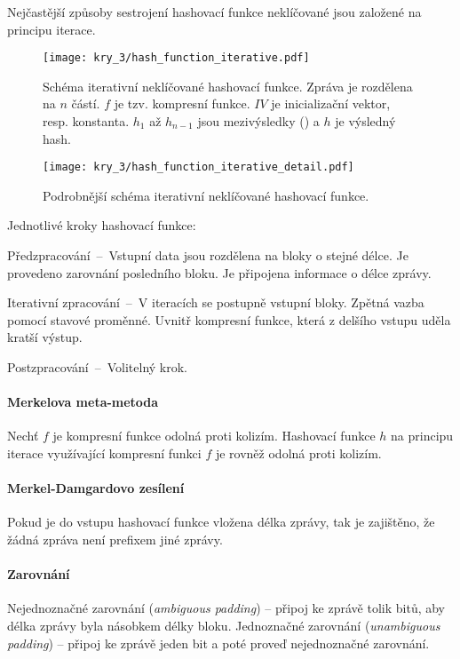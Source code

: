 Nejčastější způsoby sestrojení hashovací funkce neklíčované jsou založené na principu iterace.

\begin{figure}[H]
    \centering
    \texttt{[image: kry\_3/hash\_function\_iterative.pdf]}
    \caption{Schéma iterativní neklíčované hashovací funkce. Zpráva je rozdělena na $n$ částí. $f$ je tzv. kompresní funkce. $IV$ je inicializační vektor, resp. konstanta. $h_1$ až $h_{n-1}$ jsou mezivýsledky () a $h$ je výsledný hash.}
\end{figure}

\begin{figure}[H]
    \centering
    \texttt{[image: kry\_3/hash\_function\_iterative\_detail.pdf]}
    \caption{Podrobnější schéma iterativní neklíčované hashovací funkce.}
\end{figure}

Jednotlivé kroky hashovací funkce: \begin{compactitem}
    \item Předzpracování~--~Vstupní data jsou rozdělena na bloky o stejné délce. Je provedeno zarovnání posledního bloku. Je připojena informace o délce zprávy.
    \item Iterativní zpracování~--~V iteracích se postupně  vstupní bloky. Zpět\-ná vazba pomocí stavové proměnné. Uvnitř kompresní funkce, která z delšího vstupu uděla kratší výstup.
    \item Postzpracování~--~Volitelný krok.
\end{compactitem}

\paragraph*{Merkelova meta-metoda} Nechť $f$ je kompresní funkce odolná proti kolizím. Hashovací funkce $h$ na principu iterace využívající kompresní funkci $f$ je rovněž odolná proti kolizím.

\paragraph*{Merkel-Damgardovo zesílení} Pokud je do vstupu hashovací funkce vložena délka zprá\-vy, tak je zajištěno, že žádná zpráva není prefixem jiné zprávy.

\paragraph*{Zarovnání} Nejednoznačné zarovnání (\textit{ambiguous padding}) -- připoj ke zprávě tolik bitů, aby délka zprávy byla násobkem délky bloku. Jednoznačné zarovnání (\textit{unambiguous padding}) -- připoj ke zprávě jeden bit a poté proveď nejednoznačné zarovnání.


